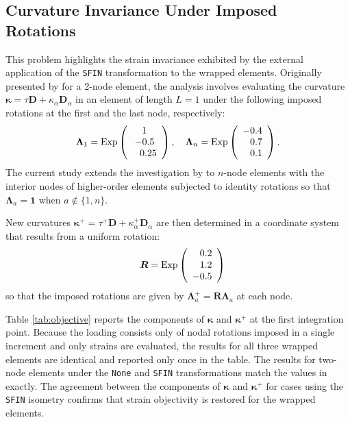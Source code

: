 
\hypertarget{example-1-curvature-invariance}{%
\subsection{Curvature Invariance Under Imposed Rotations}\label{example-1-curvature-invariance}}

This problem highlights the strain invariance %
exhibited by the external application of the \texttt{SFIN} transformation to the wrapped
elements. 
Originally presented by \cite{crisfield1999objectivity} for a 2-node element,
the analysis involves evaluating the curvature
\(\boldsymbol{\kappa} = \tau \mathbf{D} + \kappa_\alpha \mathbf{D}_\alpha\)
in an element of length \(L = 1\) under
the following imposed rotations at the first and the last node, respectively:
\[
\boldsymbol{\Lambda}_1= \operatorname{Exp} \left(\begin{array}{c}
1 \\
-0.5 \\
\hphantom{-}0.25
\end{array}\right),
%
\quad \boldsymbol{\Lambda}_n= \operatorname{Exp}\left(\begin{array}{c}
-0.4 \\
\hphantom{-}0.7 \\
\hphantom{-}0.1
\end{array}\right).
\]
The current study extends the investigation by  
\cite{jelenić1999geometrically}
to \(n\)-node elements %
with the interior nodes of higher-order elements subjected to 
identity rotations so that \(\boldsymbol{\Lambda}_a = \boldsymbol{1}\) when \(a \notin \{1,n\}\).

New curvatures
\(\boldsymbol{\kappa}^+ = \tau^+ \mathbf{D} + \kappa_\alpha^+\mathbf{D}_\alpha\) are then determined 
in a coordinate system that results from a uniform rotation:
\[
\quad \boldsymbol{R} = \operatorname{Exp}\left(\begin{array}{c}
\hphantom{-}0.2 \\
\hphantom{-}1.2 \\
-0.5
\end{array}\right)
\]
so that the imposed rotations are given by \(\boldsymbol{\Lambda}_a^+ = \boldsymbol{R}\boldsymbol{\Lambda}_a\) at each node.

Table \ref{tab:objective} reports the components of \(\boldsymbol{\kappa}\) and \(\boldsymbol{\kappa}^+\) at the first integration
point.
Because the loading consists only of nodal rotations
imposed in a single increment 
and only strains are evaluated, the results for all three wrapped elements
are identical and reported only once in the table.
The results for two-node elements under the \texttt{None} and \texttt{SFIN} 
transformations match the values %
in \cite{crisfield1999objectivity} exactly.
The agreement between the components of \(\boldsymbol{\kappa}\) and \(\boldsymbol{\kappa}^+\)
for cases using the \texttt{SFIN} isometry
confirms that strain objectivity is restored for the wrapped elements.


